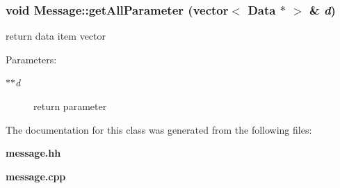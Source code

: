 \subsubsection[getAllParameter]{\setlength{\rightskip}{0pt plus 5cm}void Message::getAllParameter (vector$<$ {\bf Data} $\ast$ $>$ \& {\em d})}\label{classMessage_6a28f81ee16361c5a08a05282cd4b049}


return data item vector \begin{Desc}
\item[Parameters:]
\begin{description}
\item[{\em $\ast$$\ast$d}]return parameter \end{description}
\end{Desc}


The documentation for this class was generated from the following files:\begin{CompactItemize}
\item 
{\bf message.hh}\item 
{\bf message.cpp}\end{CompactItemize}
